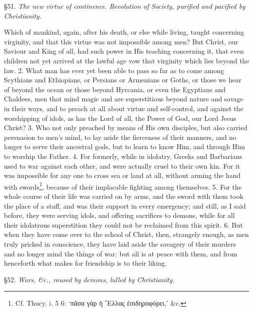§51. \emph{The new virtue of continence. Revolution of Society, purified and pacified by Christianity.}

Which of mankind, again, after his death, or else while living, taught concerning virginity, and that this virtue was not impossible among men? But Christ, our Saviour and King of all, had such power in His teaching concerning it, that even children not yet arrived at the lawful age vow that virginity which lies beyond the law. 2. What man has ever yet been able to pass so far as to come among Scythians and Ethiopians, or Persians or Armenians or Goths, or those we hear of beyond the ocean or those beyond Hyrcania, or even the Egyptians and Chaldees, men that mind magic and are superstitious beyond nature and savage in their ways, and to preach at all about virtue and self-control, and against the worshipping of idols, as has the Lord of all, the Power of God, our Lord Jesus Christ? 3. Who not only preached by means of His own disciples, but also carried persuasion to men’s mind, to lay aside the fierceness of their manners, and no longer to serve their ancestral gods, but to learn to know Him, and through Him to worship the Father. 4. For formerly, while in idolatry, Greeks and Barbarians used to war against each other, and were actually cruel to their own kin. For it was impossible for any one to cross sea or land at all, without arming the hand with swords\footnote{Cf. Thucy. i. 5 6: ‘\textgreek{πᾶσα γὰρ ἡ ῞Ελλας ἐσιδηροφόρει,}’ \&c.}, because of their implacable fighting among themselves. 5. For the whole course of their life was carried on by arms, and the sword with them took the place of a staff, and was their support in every emergency; and still, as I said before, they were serving idols, and offering sacrifices to demons, while for all their idolatrous superstition they could not be reclaimed from this spirit. 6. But when they have come over to the school of Christ, then, strangely enough, as men truly pricked in conscience, they have laid aside the savagery of their murders and no longer mind the things of war: but all is at peace with them, and from henceforth what makes for friendship is to their liking.


§52. \emph{Wars, \&c., roused by demons, lulled by Christianity.}

